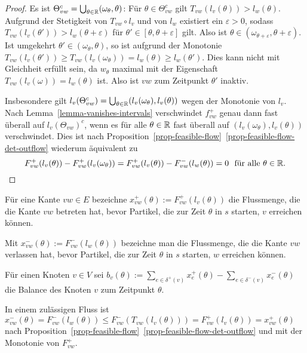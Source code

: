 \begin{proof}
	Es ist $\Theta_{vw}^c = \bigcup_{\theta\in\mathbb{R}} (\omega_\theta, \theta)$:
	Für $\theta\in\Theta_{vw}^c$ gilt $T_{vw}(l_v(\theta)) > l_w(\theta)$.
	Aufgrund der Stetigkeit von $T_{vw}\circ l_v$ und von $l_w$ existiert ein $\varepsilon>0$, sodass $T_{vw}(l_v(\theta')) > l_w(\theta+\varepsilon)$ für $\theta'\in[\theta,\theta+\varepsilon]$ gilt.
	Also ist $\theta\in(\omega_{\theta+\varepsilon}, \theta+\varepsilon)$.
	Ist umgekehrt $\theta'\in (\omega_\theta,\theta)$, so ist aufgrund der Monotonie $T_{vw}(l_v(\theta'))\geq T_{vw}(l_v(\omega_\theta)) = l_w(\theta)\geq l_w(\theta')$.
	Dies kann nicht mit Gleichheit erfüllt sein, da $w_\theta$ maximal mit der Eigenschaft $T_{vw}(l_v(\omega)) = l_w(\theta)$ ist.
	Also ist $vw$ zum Zeitpunkt $\theta'$ inaktiv.
	
	Insbesondere gilt $l_v(\Theta_{vw}^c) = \bigcup_{\theta\in\mathbb{R}}(l_v(\omega_\theta),l_v(\theta))$ wegen der Monotonie von $l_v$.
	Nach Lemma~\ref{lemma-vanishes-intervals} verschwindet $f_{vw}^+$ genau dann fast überall auf $l_v(\Theta_{vw})^c$, wenn es für alle $\theta\in\mathbb{R}$ fast überall auf $(l_v(\omega_\theta),l_v(\theta))$ verschwindet.
	Dies ist nach Proposition~\ref{prop-feasible-flow}~\ref{prop-feasible-flow-det-outflow} wiederum äquivalent zu
	$$F_{vw}^+(l_v(\theta))-F_{vw}^+(l_v(\omega_\theta)) = F_{vw}^+(l_v(\theta))-F_{vw}^-(l_w(\theta))=0~~\text{für alle $\theta\in\mathbb{R}$}.$$
\end{proof}



\begin{definition}
	Für eine Kante $vw\in E$ bezeichne $x_{vw}^+(\theta):= F_{vw}^+(l_v(\theta))$ die Flussmenge, die die Kante $vw$ betreten hat, bevor Partikel, die zur Zeit $\theta$ in $s$ starten, $v$ erreichen können.
	
	Mit $x_{vw}^-(\theta):= F^-_{vw}(l_w(\theta))$ bezeichne man die Flussmenge, die die Kante $vw$ verlassen hat, bevor Partikel, die zur Zeit $\theta$ in $s$ starten, $w$ erreichen können.
	
	Für einen Knoten $v\in V$ sei $b_v(\theta):=\sum_{e\in\delta^+(v)} x_e^+(\theta) - \sum_{e\in\delta^-(v)} x_e^-(\theta)$ die Balance des Knoten $v$ zum Zeitpunkt $\theta$.
\end{definition}


\begin{remark}\label{remark-x^-leqx^+}
	In einem zulässigen Fluss ist $x_{vw}^-(\theta) = F_{vw}^-(l_w(\theta)) \leq F_{vw}^-(T_{vw}(l_v(\theta)))=F_{vw}^+(l_v(\theta)) = x_{vw}^+(\theta)$
	 nach Proposition~\ref{prop-feasible-flow}~\ref{prop-feasible-flow-det-outflow} und mit der Monotonie von $F_{vw}^+$.
\end{remark}

